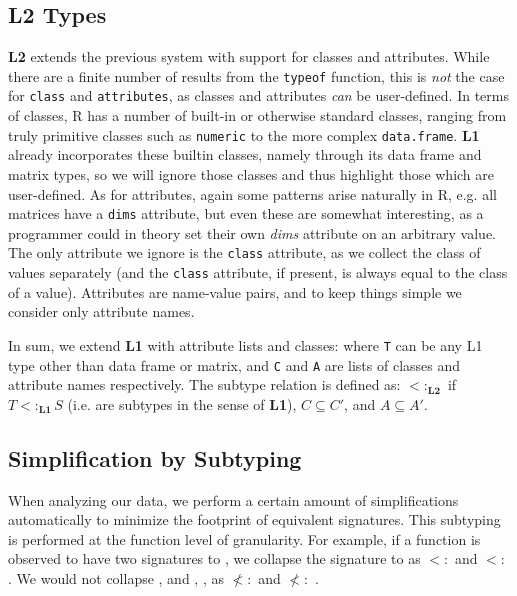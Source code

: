 \documentclass[acmsmall,10pt,review,anonymous]{acmart}\settopmatter{printfolios=true,printccs=false,printacmref=false}
\newcommand{\code}[1]{\lstinline|#1|\xspace}
\begin{document}
\subsection{L2 Types}\label{sec:L2def}

{\bf L2} extends the previous system with support for classes and
attributes.  While there are a finite number of results from the
\code{typeof} function, this is {\it not} the case for \code{class} and
\code{attributes}, as classes and attributes {\it can} be user-defined.  In
terms of classes, R has a number of built-in or otherwise standard classes,
ranging from truly primitive classes such as {\tt numeric} to the more
complex {\tt data.frame}.  {\bf L1} already incorporates these builtin
classes, namely through its data frame and matrix types, so we will ignore
those classes and thus highlight those which are user-defined.  As for
attributes, again some patterns arise naturally in R, e.g. all matrices have
a {\tt dims} attribute, but even these are somewhat interesting, as a
programmer could in theory set their own {\it dims} attribute on an
arbitrary value.  The only attribute we ignore is the {\tt class} attribute,
as we collect the class of values separately (and the {\tt class} attribute,
if present, is always equal to the class of a value).  Attributes are
name-value pairs, and to keep things simple we consider only attribute
names.

In sum, we extend {\bf L1} with attribute lists and classes:
 where {\tt T} can be any L1 type other than data frame
or matrix, and {\tt C} and {\tt A} are lists of classes and attribute names
respectively.  The subtype relation is defined as: 
$<:_{\mathbf{L2}}$ \xspace {} if $ T
<:_{\mathbf{L1}} S$ (i.e. are subtypes in the sense of {\bf L1}), $C
\subseteq C'$, and $A \subseteq A'$.

\subsection{Simplification by Subtyping}\label{sec:autosub}

When analyzing our data, we perform a certain amount of simplifications
automatically to minimize the footprint of equivalent signatures.  This
subtyping is performed at the function level of granularity.  For example,
if a function is observed to have two signatures \sD \to \df to \D \to \df,
we collapse the signature to \D \to \df as \sD $<:$ \D and \df $<:$ \df.  We
would not collapse \sD, \I \to \df and \D, \sI \to \df, as \I $\not <:$ \sI
and \D $\not<:$ \sD.
\end{document}
